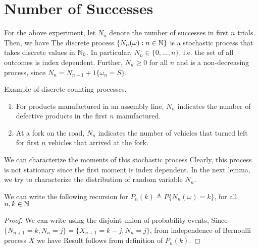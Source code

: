 \documentclass[a4paper,10pt,english]{article}
\begin{document}
\section{Number of Successes}
For the above experiment, let $N_n$ denote the number of successes in first $n$ trials. 
Then, we have 
The discrete process $\{N_n (\omega) : n\in \mathbb{N}\}$ is a stochastic process that takes discrete values in $\mathbb{N}_0$. 
In particular, $N_n \in \{0, \dots, n\}$, i.e. the set of all outcomes is index dependent. 
Further, $N_n \geq 0$ for all $n$ and is a non-decreasing process, since $N_{n} = N_{n-1} + 1\{\omega_n = S\}$. 
\begin{shaded*}
\begin{exmp}
Example of discrete counting processes. 
\begin{enumerate}[i\_]
\item For products manufactured in an assembly line, $N_n$ indicates the number of defective products in the first $n$ manufactured. 
\item At a fork on the road, $N_n$ indicates the number of vehicles that turned left for first $n$ vehicles that arrived at the fork.  
\end{enumerate}
\end{exmp}
\end{shaded*} 
We can characterize the moments of this stochastic process
Clearly, this process is not stationary since the first moment is index dependent. 
In the next lemma, we try to characterize the distribution of random variable $N_n$. 
\begin{lem} 
We can write the following recursion for $P_n(k) \triangleq P\{N_n(\omega) = k\}$, for all $n,k \in \mathbb{N}$
\end{lem}
\begin{proof}
We can write using the disjoint union of probability events,  
Since $\{N_{n+1} = k, N_{n} = j\} = \{X_{n+1} = k-j, N_{n} = j\}$, from independence of Bernoulli process $X$ we have
Result follows from definition of $P_n(k)$. 
\end{proof}
\end{document}
